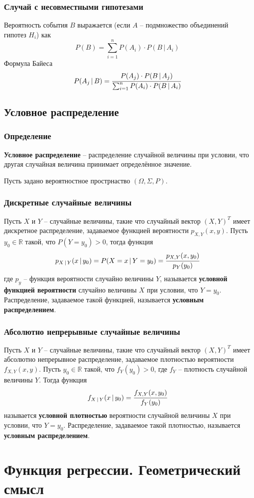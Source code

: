 \documentclass{article}
\newcommand{\R}{\mathbb{R}}
\begin{document}
\subsubsection{Случай с несовместными гипотезами}
Вероятность события $B$ выражается (если $A$ -- подмножество объединений гипотез $H_i$) как $$ P(B)=\sum_{i=1}^n P(A_i)\cdot P(B\,|\,A_i)$$
Формула Байеса
$$ P(A_j\,|\,B)=\cfrac{P(A_j)\cdot P(B\,|\,A_j)}{\sum_{i=1}^n P(A_i)\cdot P(B\,|\,A_i)}  $$
\subsection{Условное распределение}
\subsubsection{Определение}
\textbf{Условное распределение} -- распределение случайной величины при условии, что другая случайная величина принимает определённое значение.

Пусть задано вероятностное прострнаство $(\Omega,\Sigma,P)$.
\subsubsection{Дискретные случайные величины}
Пусть $X$ и $Y$ -- случайные величины, такие что случайный вектор $(X,Y)^T$ имеет дискретное распределение, задаваемое функцией вероятности $p_{X,Y}(x,y)$. Пусть $y_0\in\R$ такой, что $P(Y=y_0)>0$, тогда функция
$$ p_{X\,|\,Y}(x\,|\,y_0)=P(X=x\,|\,Y=y_0)=\cfrac{p_{X,Y}(x,y_0)}{p_Y(y_0)} $$
где $p_y$ -- функция вероятности случайно величины $Y$, называется \textbf{условной функцией вероятности} случайно величины $X$ при условии, что $Y=y_0$. Распределение, задаваемое такой функцией, называется \textbf{условным распределением}.
\subsubsection{Абсолютно непрерывные случайные величины}
Пусть $X$ и $Y$ -- случайные величины, такие что случайный вектор $(X,Y)^T$ имеет абсолютно непрерывное распределение, задаваемое плотностью вероятности $f_{X,Y}(x,y)$. Пусть $y_0\in\R$ такой, что $f_Y(y_0)>0$, где $f_Y$ -- плотность случайной величины $Y$. Тогда функция
$$ f_{X\,|\,Y}(x\,|\,y_0)=\cfrac{f_{X,Y}(x,y_0)}{f_Y(y_0)} $$
называется \textbf{условной плотностью} вероятности случайной величины $X$ при условии, что $Y=y_0$. Распределение, задаваемое такой плотностью, называется \textbf{условным распределением}.
\newpage
\section{Функция регрессии. Геометрический смысл}
\end{document}
